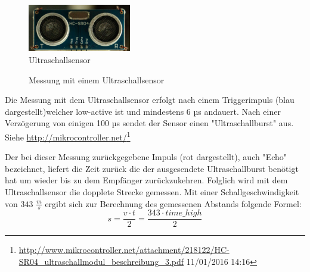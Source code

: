 \begin{figure}
  \begin{centering}
    \includegraphics[width = 0.4\textwidth]{Bilder/Ultraschallsensor}
  \par\end{centering}
  \caption{Ultraschallsensor}
  \label{Ultraschallsensor}
\end{figure}

\begin{figure}[tbh]
  \begin{centering}
  \par\end{centering}
  \caption{Messung mit einem Ultraschallsensor}
  \label{Ultraschallmessung}
\end{figure}

Die Messung mit dem Ultraschallsensor erfolgt nach einem Triggerimpuls (blau dargestellt)welcher low-active ist und mindestens 6 µs andauert. Nach einer Verzögerung von einigen 100 µs sendet der Sensor einen "Ultraschallburst" aus.
\\Siehe \url{http://mikrocontroller.net/}\footnote{\url{http://www.mikrocontroller.net/attachment/218122/HC-SR04_ultraschallmodul_beschreibung_3.pdf} 11/01/2016 14:16}

\needspace{2cm}
Der bei dieser Messung zurückgegebene Impuls (rot dargestellt), auch "Echo" bezeichnet, liefert die Zeit zurück die der ausgesendete Ultraschallburst benötigt hat um wieder bis zu dem Empfänger zurückzukehren. Folglich wird mit dem Ultraschallsensor die dopplete Strecke gemessen.
Mit einer Schallgeschwindigkeit von $343$ $\frac{m}{s}$ ergibt sich zur Berechnung des gemessenen Abstands folgende Formel:
\[
s = \frac{v \cdot t}{2} = \frac{343 \cdot time\_high}{2}
\]
\newpage
